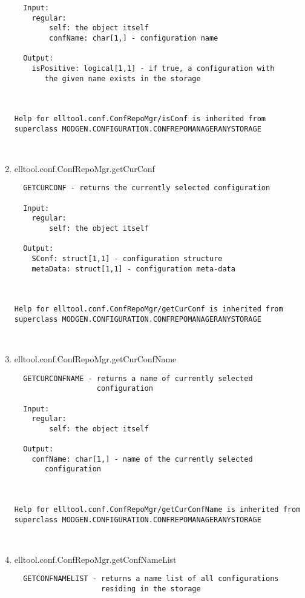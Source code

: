 \begin{enumerate}
\begin{lstlisting}
  Input:
    regular:
        self: the object itself
        confName: char[1,] - configuration name

  Output:
    isPositive: logical[1,1] - if true, a configuration with
       the given name exists in the storage



Help for elltool.conf.ConfRepoMgr/isConf is inherited from superclass MODGEN.CONFIGURATION.CONFREPOMANAGERANYSTORAGE



\end{lstlisting}
\fontfamily{\familydefault}
\selectfont
\item {elltool.conf.ConfRepoMgr.getCurConf}
\selectfont
\begin{lstlisting}
  GETCURCONF - returns the currently selected configuration

  Input:
    regular:
        self: the object itself

  Output:
    SConf: struct[1,1] - configuration structure
    metaData: struct[1,1] - configuration meta-data



Help for elltool.conf.ConfRepoMgr/getCurConf is inherited from superclass MODGEN.CONFIGURATION.CONFREPOMANAGERANYSTORAGE



\end{lstlisting}
\fontfamily{\familydefault}
\selectfont
\item {elltool.conf.ConfRepoMgr.getCurConfName}
\selectfont
\begin{lstlisting}
  GETCURCONFNAME - returns a name of currently selected
                   configuration

  Input:
    regular:
        self: the object itself

  Output:
    confName: char[1,] - name of the currently selected
       configuration



Help for elltool.conf.ConfRepoMgr/getCurConfName is inherited from superclass MODGEN.CONFIGURATION.CONFREPOMANAGERANYSTORAGE



\end{lstlisting}
\fontfamily{\familydefault}
\selectfont
\item {elltool.conf.ConfRepoMgr.getConfNameList}
\selectfont
\begin{lstlisting}
  GETCONFNAMELIST - returns a name list of all configurations
                    residing in the storage


\end{lstlisting}
\end{enumerate}
